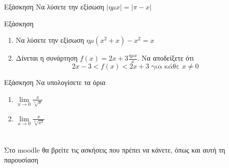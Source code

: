 \documentclass[greek]{beamer}
\begin{document}
\begin{frame}{Εξάσκηση}
 Να λύσετε την εξίσωση $|ημx|=|π-x|$
\end{frame}

\begin{frame}{Εξάσκηση}
 \begin{enumerate}
  \item Να λύσετε την εξίσωση $ημ(x^2+x)-x^2=x$ \pause
  \item Δίνεται η συνάρτηση $f(x)=2x+3\frac{ημx}{x}$. Να αποδείξετε ότι
        $$2x-3<f(x)<2x+3 \text{ για κάθε } x\ne 0$$
 \end{enumerate}
\end{frame}

\begin{frame}{Εξάσκηση}
 Να υπολογίσετε τα όρια
 \begin{enumerate}
  \item $\lim\limits_{x \to 0}{ \frac{x}{\sqrt[3]{x}} }$ \pause
  \item $\lim\limits_{x \to 0}{ \frac{x}{\sqrt[3]{x^2}} }$
 \end{enumerate}
\end{frame}

\section{}
\begin{frame}
 Στο moodle θα βρείτε τις ασκήσεις που πρέπει να κάνετε, όπως και αυτή τη παρουσίαση
\end{frame}
\end{document}
